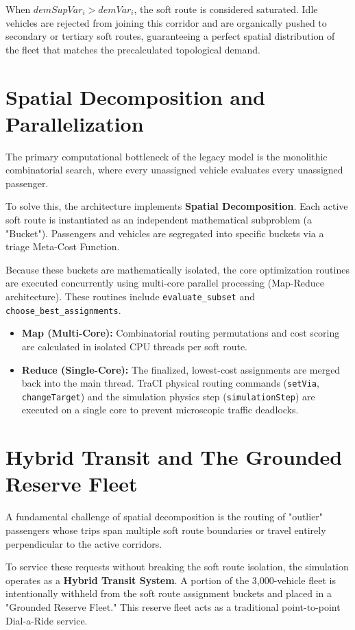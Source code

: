\documentclass[12pt,a4paper]{article}
\begin{document}
When $demSupVar_i > demVar_i$, the soft route is considered saturated. Idle vehicles are rejected from joining this corridor and are organically pushed to secondary or tertiary soft routes, guaranteeing a perfect spatial distribution of the fleet that matches the precalculated topological demand.

\section{Spatial Decomposition and Parallelization}
The primary computational bottleneck of the legacy model is the monolithic combinatorial search, where every unassigned vehicle evaluates every unassigned passenger.

To solve this, the architecture implements \textbf{Spatial Decomposition}. Each active soft route is instantiated as an independent mathematical subproblem (a "Bucket"). Passengers and vehicles are segregated into specific buckets via a triage Meta-Cost Function. 

Because these buckets are mathematically isolated, the core optimization routines are executed concurrently using multi-core parallel processing (Map-Reduce architecture). These routines include \texttt{evaluate\_subset} and \texttt{choose\_best\_assignments}. 
\begin{itemize}
    \item \textbf{Map (Multi-Core):} Combinatorial routing permutations and cost scoring are calculated in isolated CPU threads per soft route.
    \item \textbf{Reduce (Single-Core):} The finalized, lowest-cost assignments are merged back into the main thread. TraCI physical routing commands (\texttt{setVia}, \texttt{changeTarget}) and the simulation physics step (\texttt{simulationStep}) are executed on a single core to prevent microscopic traffic deadlocks.
\end{itemize}

\section{Hybrid Transit and The Grounded Reserve Fleet}
A fundamental challenge of spatial decomposition is the routing of "outlier" passengers whose trips span multiple soft route boundaries or travel entirely perpendicular to the active corridors.

To service these requests without breaking the soft route isolation, the simulation operates as a \textbf{Hybrid Transit System}. A portion of the 3,000-vehicle fleet is intentionally withheld from the soft route assignment buckets and placed in a "Grounded Reserve Fleet." This reserve fleet acts as a traditional point-to-point Dial-a-Ride service.
\end{document}
